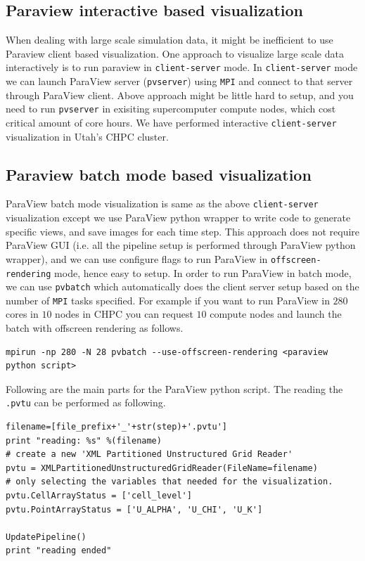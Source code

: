 \subsection{Paraview interactive based visualization}
When dealing with large scale simulation data, it might be inefficient to use Paraview client based visualization. One approach to visualize large scale data interactively is to run paraview in \texttt{client-server} mode. 
In \texttt{client-server} mode we can launch ParaView server (\texttt{pvserver}) using \texttt{MPI} and connect to that server through ParaView client. Above approach might be little hard to setup, and you need to run \texttt{pvserver} in 
exisiting supercomputer compute nodes, which cost critical amount of core hours. We have performed interactive \texttt{client-server} visualization in Utah's CHPC cluster. 

\subsection{Paraview batch mode based visualization}
ParaView batch mode visualization is same as the above \texttt{client-server} visualization except we use ParaView python wrapper to write code to generate specific views, and save images for each time step. This approach does not require 
ParaView GUI (i.e. all the pipeline setup is performed through ParaView python wrapper), and we can use configure flags to run ParaView in \texttt{offscreen-rendering} mode, hence easy to setup. In order to run ParaView in batch mode, 
we can use \texttt{pvbatch} which automatically does the client server setup based on the number of \texttt{MPI} tasks specified. For example if you want to run ParaView in $280$ cores in $10$ nodes in CHPC you can request $10$
compute nodes and launch the batch with offscreen rendering as follows. 

\begin{lstlisting}[basicstyle=\small]
mpirun -np 280 -N 28 pvbatch --use-offscreen-rendering <paraview python script>
\end{lstlisting}

Following are the main parts for the ParaView python script. The reading the \texttt{.pvtu} can be performed as following. 

\begin{lstlisting}[basicstyle=\small]
filename=[file_prefix+'_'+str(step)+'.pvtu']
print "reading: %s" %(filename)
# create a new 'XML Partitioned Unstructured Grid Reader'
pvtu = XMLPartitionedUnstructuredGridReader(FileName=filename)
# only selecting the variables that needed for the visualization.
pvtu.CellArrayStatus = ['cell_level'] 
pvtu.PointArrayStatus = ['U_ALPHA', 'U_CHI', 'U_K']

UpdatePipeline()
print "reading ended"
\end{lstlisting}

